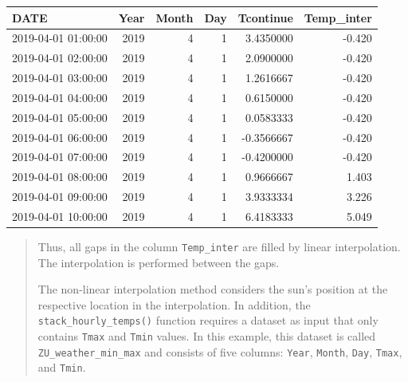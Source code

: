 \documentclass[
]{book}
\begin{document}
\begingroup\fontsize{10}{12}\selectfont

\begin{tabular}{l|r|r|r|r|r}
\hline
DATE & Year & Month & Day & Tcontinue & Temp\_inter\\
\hline
2019-04-01 01:00:00 & 2019 & 4 & 1 & 3.4350000 & -0.420\\
\hline
2019-04-01 02:00:00 & 2019 & 4 & 1 & 2.0900000 & -0.420\\
\hline
2019-04-01 03:00:00 & 2019 & 4 & 1 & 1.2616667 & -0.420\\
\hline
2019-04-01 04:00:00 & 2019 & 4 & 1 & 0.6150000 & -0.420\\
\hline
2019-04-01 05:00:00 & 2019 & 4 & 1 & 0.0583333 & -0.420\\
\hline
2019-04-01 06:00:00 & 2019 & 4 & 1 & -0.3566667 & -0.420\\
\hline
2019-04-01 07:00:00 & 2019 & 4 & 1 & -0.4200000 & -0.420\\
\hline
2019-04-01 08:00:00 & 2019 & 4 & 1 & 0.9666667 & 1.403\\
\hline
2019-04-01 09:00:00 & 2019 & 4 & 1 & 3.9333334 & 3.226\\
\hline
2019-04-01 10:00:00 & 2019 & 4 & 1 & 6.4183333 & 5.049\\
\hline
\end{tabular}
\endgroup{}

\begin{quote}
Thus, all gaps in the column \texttt{Temp\_inter} are filled by linear interpolation. The interpolation is performed between the gaps.

The non-linear interpolation method considers the sun's position at the respective location in the interpolation. In addition, the \texttt{stack\_hourly\_temps()} function requires a dataset as input that only contains \texttt{Tmax} and \texttt{Tmin} values. In this example, this dataset is called \texttt{ZU\_weather\_min\_max} and consists of five columns: \texttt{Year}, \texttt{Month}, \texttt{Day}, \texttt{Tmax}, and \texttt{Tmin}.
\end{quote}
\end{document}

